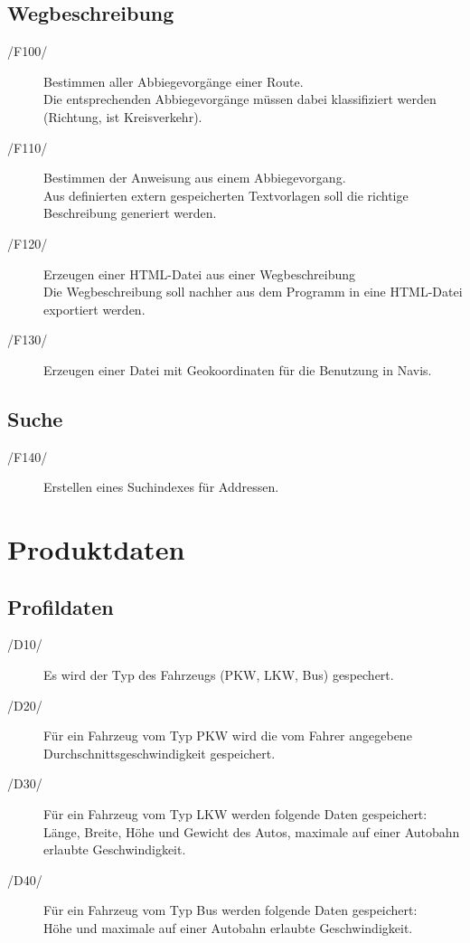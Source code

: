 \documentclass[a4paper, 11pt]{article}
\begin{document}
\subsection{Wegbeschreibung}
\begin{description}
\item[/F100/]
Bestimmen aller Abbiegevorgänge einer Route.\\
Die entsprechenden Abbiegevorgänge müssen dabei klassifiziert werden (Richtung, ist Kreisverkehr).
\item[/F110/]
Bestimmen der Anweisung aus einem Abbiegevorgang.\\
Aus definierten extern gespeicherten Textvorlagen soll die richtige Beschreibung generiert werden.
\item[/F120/]
Erzeugen einer HTML-Datei aus einer Wegbeschreibung\\
Die Wegbeschreibung soll nachher aus dem Programm in eine HTML-Datei exportiert werden.
\item[/F130/]
Erzeugen einer Datei mit Geokoordinaten für die Benutzung in Navis.
\end{description}
\subsection{Suche}
\begin{description}
\item[/F140/]
Erstellen eines Suchindexes für Addressen.

\end{description}
\section{Produktdaten}
\subsection{Profildaten}
\begin{description}
\item [/D10/\label{D10}]
Es wird der Typ des Fahrzeugs (PKW, LKW, Bus) gespechert.
\item [/D20/]
Für ein Fahrzeug vom Typ  PKW wird die vom Fahrer angegebene Durchschnittsgeschwindigkeit gespeichert.
\item [/D30/]
Für ein Fahrzeug vom Typ  LKW werden folgende Daten gespeichert:\\
Länge, Breite, Höhe und Gewicht des Autos, maximale auf einer Autobahn erlaubte Geschwindigkeit.
\item [/D40/]
Für ein Fahrzeug vom Typ Bus werden folgende Daten gespeichert:\\
Höhe und maximale auf einer Autobahn erlaubte Geschwindigkeit.
\end{description}
\end{document}
